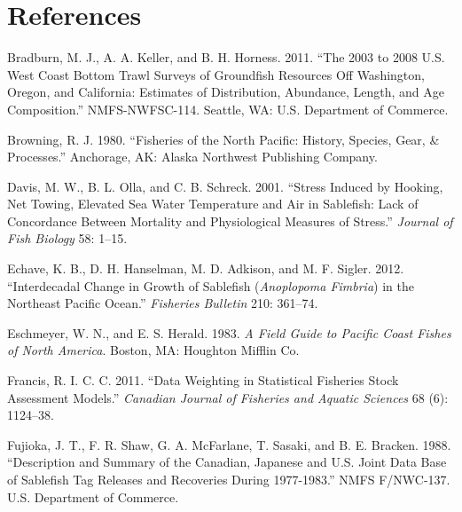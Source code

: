 \documentclass[11pt,
  english,
  a4paper,
]{article}
\newlength{\cslhangindent}
\newenvironment{cslreferences}%
  {\setlength{\parindent}{0pt}%
  \everypar{\setlength{\hangindent}{\cslhangindent}}\ignorespaces}%
  {\par}
\begin{document}
\hypertarget{references}{%
\section{References}\label{references}}

\leavevmode\tagmcend\tagstructend


\hypertarget{refs}{}
\begin{cslreferences}
\leavevmode\hypertarget{ref-bradburn_2003_2011}{}%
Bradburn, M. J., A. A. Keller, and B. H. Horness. 2011. ``The 2003 to 2008 U.S. West Coast Bottom Trawl Surveys of Groundfish Resources Off Washington, Oregon, and California: Estimates of Distribution, Abundance, Length, and Age Composition.'' NMFS-NWFSC-114. Seattle, WA: U.S. Department of Commerce.

\leavevmode\hypertarget{ref-browning1980}{}%
Browning, R. J. 1980. ``Fisheries of the North Pacific: History, Species, Gear, \& Processes.'' Anchorage, AK: Alaska Northwest Publishing Company.

\leavevmode\hypertarget{ref-davis2001}{}%
Davis, M. W., B. L. Olla, and C. B. Schreck. 2001. ``Stress Induced by Hooking, Net Towing, Elevated Sea Water Temperature and Air in Sablefish: Lack of Concordance Between Mortality and Physiological Measures of Stress.'' \emph{Journal of Fish Biology} 58: 1--15.

\leavevmode\hypertarget{ref-echave2012fishbullinterdecadal}{}%
Echave, K. B., D. H. Hanselman, M. D. Adkison, and M. F. Sigler. 2012. ``Interdecadal Change in Growth of Sablefish (\emph{Anoplopoma Fimbria}) in the Northeast Pacific Ocean.'' \emph{Fisheries Bulletin} 210: 361--74.

\leavevmode\hypertarget{ref-eschmeyer1983}{}%
Eschmeyer, W. N., and E. S. Herald. 1983. \emph{A Field Guide to Pacific Coast Fishes of North America}. Boston, MA: Houghton Mifflin Co.

\leavevmode\hypertarget{ref-Francis2011}{}%
Francis, R. I. C. C. 2011. ``Data Weighting in Statistical Fisheries Stock Assessment Models.'' \emph{Canadian Journal of Fisheries and Aquatic Sciences} 68 (6): 1124--38.

\leavevmode\hypertarget{ref-fujioka1988docdescription}{}%
Fujioka, J. T., F. R. Shaw, G. A. McFarlane, T. Sasaki, and B. E. Bracken. 1988. ``Description and Summary of the Canadian, Japanese and U.S. Joint Data Base of Sablefish Tag Releases and Recoveries During 1977-1983.'' NMFS F/NWC-137. U.S. Department of Commerce.


\end{cslreferences}
\end{document}
